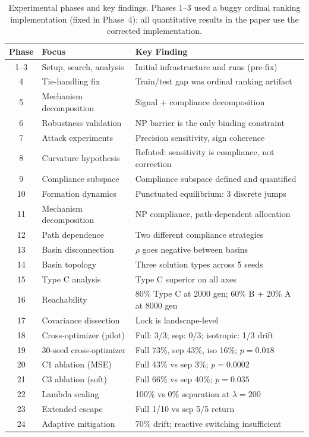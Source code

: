 \documentclass[twoside,11pt]{article}
\begin{document}
\begin{table}[t]
\caption{Experimental phases and key findings. Phases 1--3 used a buggy ordinal
ranking implementation (fixed in Phase~4); all quantitative results in the paper
use the corrected implementation.}
\label{tab:timeline}
\centering
\small
\begin{tabular}{clp{7cm}}
\toprule
Phase & Focus & Key Finding \\
\midrule
1--3 & Setup, search, analysis & Initial infrastructure and runs (pre-fix) \\
4 & Tie-handling fix & Train/test gap was ordinal ranking artifact \\
5 & Mechanism decomposition & Signal + compliance decomposition \\
6 & Robustness validation & NP barrier is the only binding constraint \\
7 & Attack experiments & Precision sensitivity, sign coherence \\
8 & Curvature hypothesis & Refuted: sensitivity is compliance, not correction \\
9 & Compliance subspace & Compliance subspace defined and quantified \\
10 & Formation dynamics & Punctuated equilibrium: 3 discrete jumps \\
11 & Mechanism decomposition & NP compliance, path-dependent allocation \\
12 & Path dependence & Two different compliance strategies \\
13 & Basin disconnection & $\rho$ goes negative between basins \\
14 & Basin topology & Three solution types across 5 seeds \\
15 & Type C analysis & Type C superior on all axes \\
16 & Reachability & 80\% Type C at 2000 gen; 60\% B + 20\% A at 8000 gen \\
17 & Covariance dissection & Lock is landscape-level \\
18 & Cross-optimizer (pilot) & Full: 3/3; sep: 0/3; isotropic: 1/3 drift \\
19 & 30-seed cross-optimizer & Full 73\%, sep 43\%, iso 16\%; $p = 0.018$ \\
20 & C1 ablation (MSE) & Full 43\% vs sep 3\%; $p = 0.0002$ \\
21 & C3 ablation (soft) & Full 66\% vs sep 40\%; $p = 0.035$ \\
22 & Lambda scaling & 100\% vs 0\% separation at $\lambda = 200$ \\
23 & Extended escape & Full 1/10 vs sep 5/5 return \\
24 & Adaptive mitigation & 70\% drift; reactive switching insufficient \\
\bottomrule
\end{tabular}
\end{table}
\end{document}
